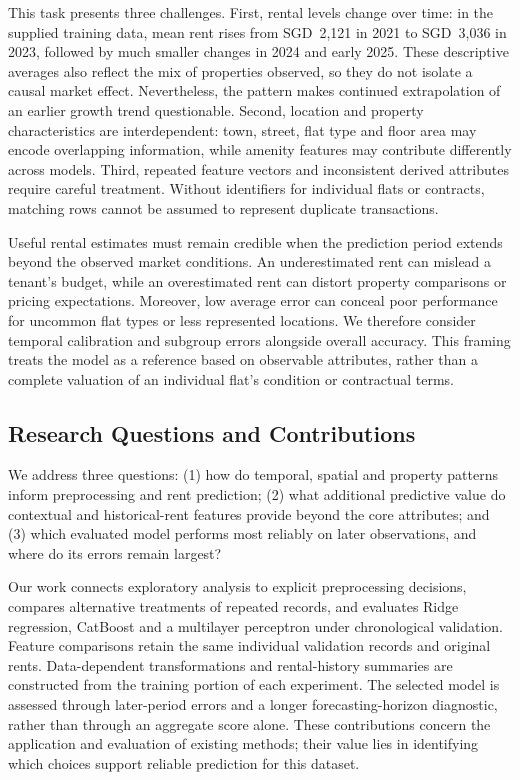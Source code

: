 \documentclass[conference]{IEEEtran}
\begin{document}
This task presents three challenges. First, rental levels change over time:
in the supplied training data, mean rent rises from SGD~2,121 in 2021 to
SGD~3,036 in 2023, followed by much smaller changes in 2024 and early 2025.
These descriptive averages also reflect the mix of properties observed, so
they do not isolate a causal market effect. Nevertheless, the pattern makes
continued extrapolation of an earlier growth trend questionable. Second,
location and property characteristics are interdependent: town, street,
flat type and floor area may encode overlapping information, while amenity
features may contribute differently across models. Third, repeated feature
vectors and inconsistent derived attributes require careful treatment.
Without identifiers for individual flats or contracts, matching rows cannot
be assumed to represent duplicate transactions.

Useful rental estimates must remain credible when the prediction period
extends beyond the observed market conditions. An underestimated rent can
mislead a tenant's budget, while an overestimated rent can distort property
comparisons or pricing expectations. Moreover, low average error can conceal
poor performance for uncommon flat types or less represented locations.
We therefore consider temporal calibration and subgroup errors alongside
overall accuracy. This framing treats the model as a reference based on
observable attributes, rather than a complete valuation of an individual
flat's condition or contractual terms.

\subsection{Research Questions and Contributions}
We address three questions: (1) how do temporal, spatial and property
patterns inform preprocessing and rent prediction; (2) what additional
predictive value do contextual and historical-rent features provide beyond
the core attributes; and (3) which evaluated model performs most reliably
on later observations, and where do its errors remain largest?

Our work connects exploratory analysis to explicit preprocessing decisions,
compares alternative treatments of repeated records, and evaluates Ridge
regression, CatBoost and a multilayer perceptron under chronological
validation. Feature comparisons retain the same individual validation
records and original rents. Data-dependent transformations and rental-history
summaries are constructed from the training portion of each experiment.
The selected model is assessed through later-period errors and a longer
forecasting-horizon diagnostic, rather than through an aggregate score alone.
These contributions concern the application and evaluation of existing
methods; their value lies in identifying which choices support reliable
prediction for this dataset.
\end{document}
